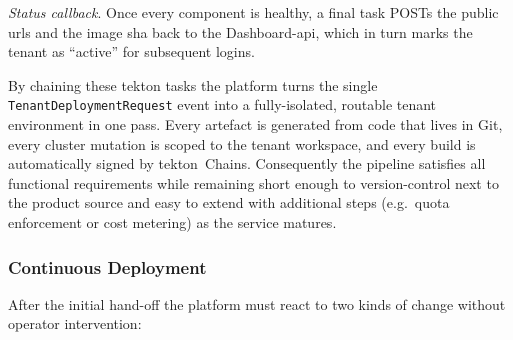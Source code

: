 \documentclass[11pt, a4paper, oneside, listof=totoc]{scrartcl}
\begin{document}
\begin{enumerate}[label={[\arabic*]:},
                    ref=Challenge~\arabic*,
                    leftmargin=*,
                    itemsep=0.6\baselineskip]
                    \item\label{chal:callback}
                        \textit{Status callback}.  
                        Once every component is healthy, a final task POSTs the public \glspl{url}
                        and the image \gls{sha} back to the Dashboard-\gls{api}, which in turn marks
                        the tenant as \enquote{active} for subsequent logins.
                        
                \end{enumerate}

                By chaining these \gls{tekton} tasks the platform turns the single
                \texttt{TenantDeploymentRequest} event into a fully-isolated, routable tenant
                environment in one pass.
                Every artefact is generated from code that lives in Git, every cluster mutation is
                scoped to the tenant workspace, and every build is automatically signed by
                \gls{tekton}~Chains.
                Consequently the pipeline satisfies all functional requirements while
                remaining short enough to version-control next to the product source and easy to
                extend with additional steps (e.g.\ quota enforcement or cost metering) as the
                service matures.

            \subsubsection{Continuous Deployment}\label{subsubsec:continuousDeployment}
                After the initial hand-off the platform must react to two kinds of change without
                operator intervention:
\end{document}
